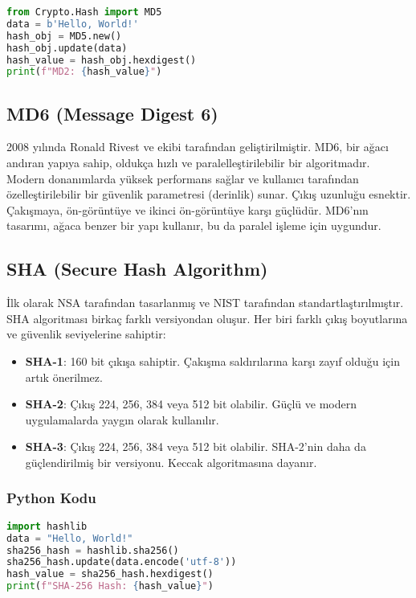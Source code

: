 \begin{lstlisting}[language=Python]
from Crypto.Hash import MD5
data = b'Hello, World!'
hash_obj = MD5.new()
hash_obj.update(data)
hash_value = hash_obj.hexdigest()
print(f"MD2: {hash_value}")
\end{lstlisting}

\newpage

\subsection{MD6 (Message Digest 6)}

2008 yılında Ronald Rivest ve ekibi tarafından geliştirilmiştir. MD6, bir ağacı andıran yapıya sahip, oldukça hızlı ve paralelleştirilebilir bir algoritmadır. Modern donanımlarda yüksek performans sağlar ve kullanıcı tarafından özelleştirilebilir bir güvenlik parametresi (derinlik) sunar. Çıkış uzunluğu esnektir.  Çakışmaya, ön-görüntüye ve ikinci ön-görüntüye karşı güçlüdür. MD6'nın tasarımı, ağaca benzer bir yapı kullanır, bu da paralel işleme için uygundur.

\newpage

\subsection{SHA (Secure Hash Algorithm)}

İlk olarak NSA tarafından tasarlanmış ve NIST tarafından standartlaştırılmıştır. SHA algoritması birkaç farklı versiyondan oluşur. Her biri farklı çıkış boyutlarına ve güvenlik seviyelerine sahiptir:

\begin{itemize}
    \item \textbf{SHA-1}: 160 bit çıkışa sahiptir. Çakışma saldırılarına karşı zayıf olduğu için artık önerilmez.
    \item \textbf{SHA-2}: Çıkış 224, 256, 384 veya 512 bit olabilir. Güçlü ve modern uygulamalarda yaygın olarak kullanılır.
    \item \textbf{SHA-3}: Çıkış 224, 256, 384 veya 512 bit olabilir. SHA-2'nin daha da güçlendirilmiş bir versiyonu. Keccak algoritmasına dayanır.
\end{itemize}

\subsubsection{Python Kodu}

\begin{lstlisting}[language=Python]
import hashlib
data = "Hello, World!"
sha256_hash = hashlib.sha256()
sha256_hash.update(data.encode('utf-8'))
hash_value = sha256_hash.hexdigest()
print(f"SHA-256 Hash: {hash_value}")
\end{lstlisting}


